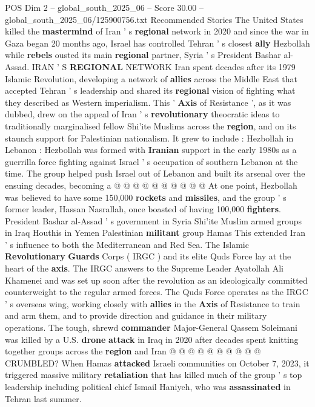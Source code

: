 \begin{textsample}{POS Dim 2 – global\_south\_2025\_06 – Score 30.00 – global\_south\_2025\_06/125900756.txt}  \label{ex:f2_pos_241}
Recommended Stories The United States killed the \textbf{mastermind} of Iran ' s \textbf{regional} network in 2020 and since the war in Gaza began 20 months ago, Israel has controlled Tehran ' s closest \textbf{ally} Hezbollah while \textbf{rebels} ousted its main \textbf{regional} partner, Syria ' s President Bashar al-Assad.
IRAN ' S \textbf{REGIONAL} NETWORK Iran spent decades after its 1979 Islamic Revolution, developing a network of \textbf{allies} across the Middle East that accepted Tehran ' s leadership and shared its \textbf{regional} vision of fighting what they described as Western imperialism.
This ' \textbf{Axis} of Resistance ', as it was dubbed, drew on the appeal of Iran ' s \textbf{revolutionary} theocratic ideas to traditionally marginalised fellow Shi'ite Muslims across the \textbf{region}, and on its staunch support for Palestinian nationalism.
It grew to include : Hezbollah in Lebanon : Hezbollah was formed with \textbf{Iranian} support in the early 1980s as a guerrilla force fighting against Israel ' s occupation of southern Lebanon at the time.
The group helped push Israel out of Lebanon and built its arsenal over the ensuing decades, becoming a @ @ @ @ @ @ @ @ @ @ At one point, Hezbollah was believed to have some 150,000 \textbf{rockets} and \textbf{missiles}, and the group ' s former leader, Hassan Nasrallah, once boasted of having 100,000 \textbf{fighters}.
President Bashar al-Assad ' s government in Syria Shi'ite Muslim armed groups in Iraq Houthis in Yemen Palestinian \textbf{militant} group Hamas This extended Iran ' s influence to both the Mediterranean and Red Sea.
The Islamic \textbf{Revolutionary} \textbf{Guards} Corps ( IRGC ) and its elite Quds Force lay at the heart of the \textbf{axis}.
The IRGC answers to the Supreme Leader Ayatollah Ali Khamenei and was set up soon after the revolution as an ideologically committed counterweight to the regular armed forces.
The Quds Force operates as the IRGC ' s overseas wing, working closely with \textbf{allies} in the \textbf{Axis} of Resistance to train and arm them, and to provide direction and guidance in their military operations.
The tough, shrewd \textbf{commander} Major-General Qassem Soleimani was killed by a U.S. \textbf{drone} \textbf{attack} in Iraq in 2020 after decades spent knitting together groups across the \textbf{region} and Iran @ @ @ @ @ @ @ @ @ @ CRUMBLED?
When Hamas \textbf{attacked} Israeli communities on October 7, 2023, it triggered massive military \textbf{retaliation} that has killed much of the group ' s top leadership including political chief Ismail Haniyeh, who was \textbf{assassinated} in Tehran last summer.

\end{textsample}
